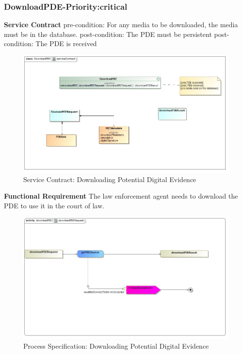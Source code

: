 \documentclass[a4paper,12pt]{article}
\begin{document}
\subsubsection{DownloadPDE-Priority:critical}
\textbf{Service Contract}\newline
pre-condition: For any media to be downloaded, the media must be in the database.\newline
post-condition: The PDE must be persistent\newline
post-condition: The PDE is received\newline
\begin{figure}[H]
\includegraphics[width=1.0\textwidth]{images/downloadserviceContract.jpg}
\caption{Service Contract: Downloading Potential Digital Evidence \label{overflow}}
\end{figure}
\textbf{Functional Requirement}\newline
	The law enforcement agent needs to download the PDE to use it in the court of law. \newpage
\begin{figure}[H]
\includegraphics[width=\textwidth]{images/downloadPDERequest.jpg}
\caption{Process Specification: Downloading Potential Digital Evidence \label{overflow}}
\end{figure}	
\end{document}
